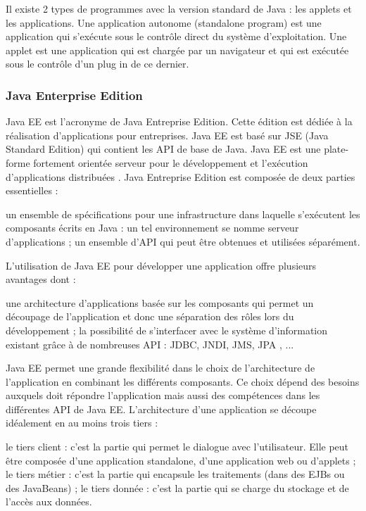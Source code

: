 Il existe 2 types de programmes avec la version standard de Java : les applets et les applications. Une application autonome (standalone program) est une application qui s'exécute sous le contrôle direct du système d'exploitation. Une applet est une application qui est chargée par un navigateur et qui est exécutée sous le contrôle d'un plug in de ce dernier.
\subsubsection{Java Enterprise Edition}
Java EE est l'acronyme de Java Entreprise Edition. Cette édition est dédiée à la
réalisation d'applications pour entreprises. Java EE est basé sur JSE (Java Standard Edition) qui
contient les API de base de Java. Java EE est une plate-forme fortement orientée serveur pour le
développement et l'exécution d'applications distribuées \cite{jee}. Java Entreprise Edition est composée de deux parties essentielles :
\begin{itemize}
	\itemtirait un ensemble de spécifications pour une infrastructure dans laquelle s'exécutent les
	composants écrits en Java : un tel environnement se nomme serveur d'applications ;
	\itemtirait un ensemble d'API qui peut être obtenues et utilisées séparément.
\end{itemize}
L'utilisation de Java EE pour développer une application offre plusieurs avantages dont :
\begin{itemize}
	\itemtirait une architecture d'applications basée sur les composants qui permet un découpage de
	l'application et donc une séparation des rôles lors du développement ;
	\itemtirait la possibilité de s'interfacer avec le système d'information existant grâce à de
	nombreuses API : JDBC, JNDI, JMS, JPA , ...
\end{itemize}
Java EE permet une grande flexibilité dans le choix de l'architecture de l'application en
combinant les différents composants. Ce choix dépend des besoins auxquels doit répondre
l'application mais aussi des compétences dans les différentes API de Java EE. L'architecture d'une
application se découpe idéalement en au moins trois tiers :
\begin{itemize}
	\itemcheck le tiers client : c'est la partie qui permet le dialogue avec l'utilisateur. Elle peut être composée d'une application standalone, d'une application web ou d'applets ;
	\itemcheck le tiers métier : c'est la partie qui encapsule les traitements (dans des EJBs ou des
	JavaBeans) ;
	\itemcheck le tiers donnée : c'est la partie qui se charge du stockage et de l'accès aux données.
\end{itemize}
